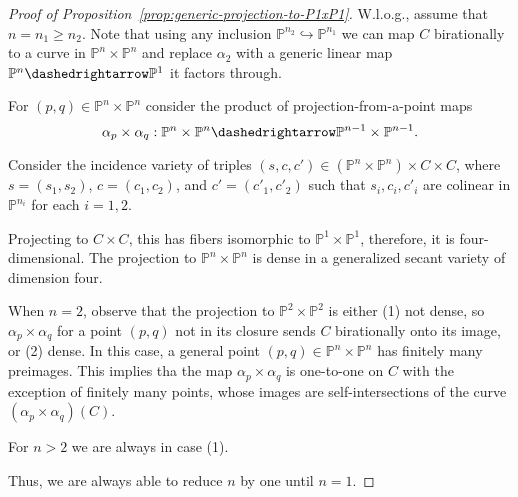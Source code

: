 \documentclass[12pt]{amsart}
\theoremstyle{definition}
\begin{document}
\begin{proof}[Proof of Proposition~\ref{prop:generic-projection-to-P1xP1}]
W.l.o.g., assume that $n=n_1\geq n_2$. Note that using any inclusion ${{\mathbb{P}}}^{n_2}\hookrightarrow{{\mathbb{P}}}^{n_1}$ we can map $C$ birationally to a curve in ${{\mathbb{P}}}^n\times{{\mathbb{P}}}^n$ and replace $\alpha_2$ with a generic linear map ${{\mathbb{P}}}^n{\dashedrightarrow}{{\mathbb{P}}}^1$ it factors through.

For $(p,q) \in {{\mathbb{P}}}^n\times{{\mathbb{P}}}^n$ consider the product of projection-from-a-point maps
$$\alpha_p\times \alpha_q:{{\mathbb{P}}}^n\times{{\mathbb{P}}}^n {\dashedrightarrow} {{\mathbb{P}}}^{n-1}\times{{\mathbb{P}}}^{n-1}.$$

Consider the incidence variety of triples
$(s,c,c')\in ({{\mathbb{P}}}^n\times{{\mathbb{P}}}^n) \times C\times C$,
where $s=(s_1,s_2)$, $c=(c_1,c_2)$, and $c'=(c'_1,c'_2)$
such that $s_i,c_i,c'_i$ are colinear in ${{\mathbb{P}}}^{n_i}$ for each $i=1,2$.

Projecting to $C\times C$, this has fibers isomorphic to ${{\mathbb{P}}}^1\times {{\mathbb{P}}}^1$, therefore, it is four-dimensional.
The projection to ${{\mathbb{P}}}^n\times{{\mathbb{P}}}^n$ is dense in a generalized secant variety of dimension four.

When $n=2$, observe that the projection to ${{\mathbb{P}}}^2\times{{\mathbb{P}}}^2$ is either
(1) not dense, so ${\alpha_p\times \alpha_q}$ for a point $(p,q)$ not in
     its closure sends $C$ birationally onto its image, or
(2) dense.  In this case, a general point  $(p,q) \in{{\mathbb{P}}}^n\times{{\mathbb{P}}}^n$
     has finitely many preimages. This implies tha the map
${\alpha_p\times \alpha_q}$ is one-to-one on $C$ with the exception of finitely many points, whose images are self-intersections of the curve $(\alpha_p\times \alpha_q)(C)$.

For $n>2$ we are always in case (1).

Thus, we are always able to reduce $n$ by one until $n=1$.
\end{proof}
\end{document}
